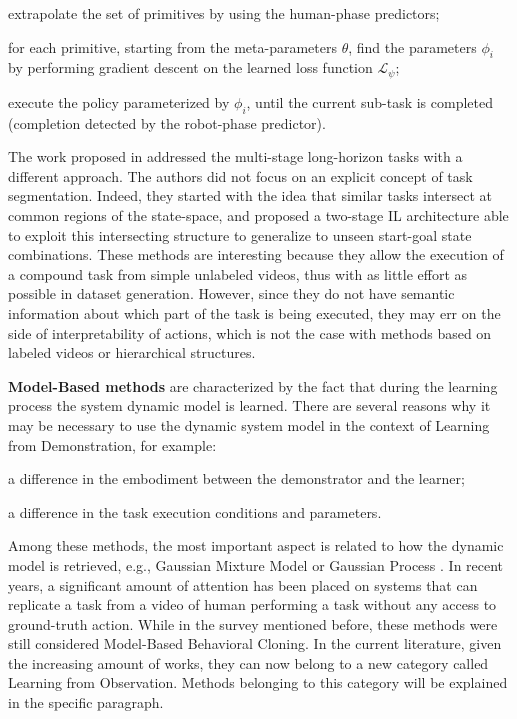 \begin{enumerate*}[label=(\textbf{\arabic*})]
    \item extrapolate the set of primitives by using the human-phase predictors;
    \item for each primitive, starting from the meta-parameters $\theta$, find the parameters $\phi_{i}$ by performing gradient descent on the learned loss function $\mathcal{L}_{\psi}$;
    \item execute the policy parameterized by $\phi_{i}$, until the current sub-task is completed (completion detected by the robot-phase predictor).
\end{enumerate*} The work proposed in \cite{Mandlekar2020GTI} addressed the multi-stage long-horizon tasks with a different approach. The authors did not focus on an explicit concept of task segmentation. Indeed, they started with the idea that similar tasks intersect at common regions of the state-space, and proposed a two-stage IL architecture able to exploit this intersecting structure to generalize to unseen start-goal state combinations.
\newline These methods are interesting because they allow the execution of a compound task from simple unlabeled videos, thus with as little effort as possible in dataset generation. However, since they do not have semantic information about which part of the task is being executed, they may err on the side of interpretability of actions, which is not the case with methods based on labeled videos or hierarchical structures.

\textbf{Model-Based methods} are characterized by the fact that during the learning process the system dynamic model is learned. There are several reasons why it may be necessary to use the dynamic system model in the context of Learning from Demonstration, for example: \begin{enumerate*}[label=\textbf{(\alph*)}]
    \item a difference in the embodiment between the demonstrator and the learner;
    \item a difference in the task execution conditions and parameters.
\end{enumerate*}
Among these methods, the most important aspect is related to how the dynamic model is retrieved, e.g., Gaussian Mixture Model \cite{grimes2009learning_actions_through_imitation} or Gaussian Process \cite{englert2013probabilistic,deisenroth2014multi_task}. In recent years, a significant amount of attention has been placed on systems that can replicate a task from a video of human performing a task without any access to ground-truth action. While in the survey mentioned before, these methods were still considered Model-Based Behavioral Cloning. In the current literature, given the increasing amount of works, they can now belong to a new category called Learning from Observation. Methods belonging to this category will be explained in the specific paragraph.